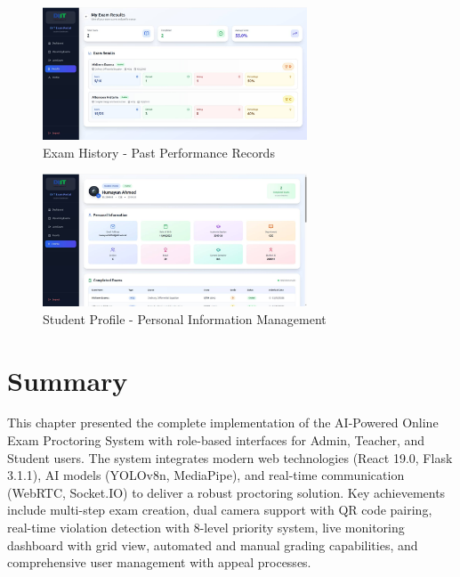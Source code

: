 \begin{figure}[p]
    \centering
    \includegraphics[width=0.7\textwidth]{Chap4/student_exam_history.jpg}
    \caption{Exam History - Past Performance Records}
    \label{fig:student_history}
\end{figure}

\begin{figure}[p]
    \centering
    \includegraphics[width=0.7\textwidth]{Chap4/student_profile.jpg}
    \caption{Student Profile - Personal Information Management}
    \label{fig:student_profile}
\end{figure}

\section{Summary}

This chapter presented the complete implementation of the AI-Powered Online Exam Proctoring System with role-based interfaces for Admin, Teacher, and Student users. The system integrates modern web technologies (React 19.0, Flask 3.1.1), AI models (YOLOv8n, MediaPipe), and real-time communication (WebRTC, Socket.IO) to deliver a robust proctoring solution. Key achievements include multi-step exam creation, dual camera support with QR code pairing, real-time violation detection with 8-level priority system, live monitoring dashboard with grid view, automated and manual grading capabilities, and comprehensive user management with appeal processes.
